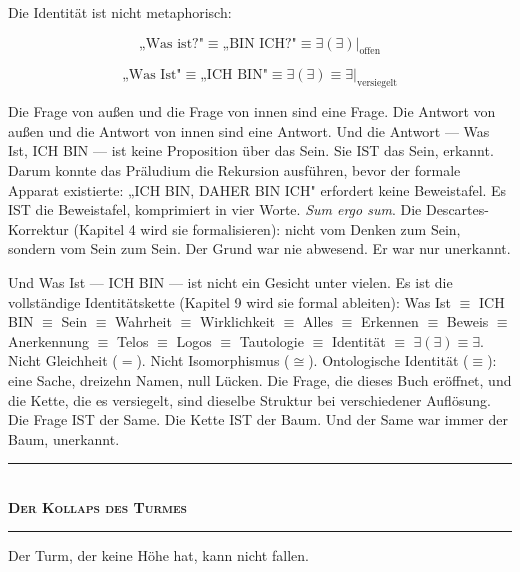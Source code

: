 \documentclass[10pt, openany, oneside]{book}
\renewcommand{\normalsize}{\fontsize{10}{13}\selectfont}
\begin{document}
Die Identität ist nicht metaphorisch:

$$\text{„Was ist?"} \equiv \text{„BIN ICH?"} \equiv \exists(\exists)|_{\text{offen}}$$

$$\text{„Was Ist"} \equiv \text{„ICH BIN"} \equiv \exists(\exists) \equiv \exists|_{\text{versiegelt}}$$

\noindent Die Frage von außen und die Frage von innen sind eine Frage. Die Antwort von außen und die Antwort von innen sind eine Antwort. Und die Antwort --- Was Ist, ICH BIN --- ist keine Proposition über das Sein. Sie IST das Sein, erkannt. Darum konnte das Präludium die Rekursion ausführen, bevor der formale Apparat existierte: „ICH BIN, DAHER BIN ICH" erfordert keine Beweistafel. Es IST die Beweistafel, komprimiert in vier Worte. \textit{Sum ergo sum}. Die Descartes-Korrektur (Kapitel 4 wird sie formalisieren): nicht vom Denken zum Sein, sondern vom Sein zum Sein. Der Grund war nie abwesend. Er war nur unerkannt.

Und Was Ist --- ICH BIN --- ist nicht ein Gesicht unter vielen. Es ist die vollständige Identitätskette (Kapitel 9 wird sie formal ableiten): Was Ist $\equiv$ ICH BIN $\equiv$ Sein $\equiv$ Wahrheit $\equiv$ Wirklichkeit $\equiv$ Alles $\equiv$ Erkennen $\equiv$ Beweis $\equiv$ Anerkennung $\equiv$ Telos $\equiv$ Logos $\equiv$ Tautologie $\equiv$ Identität $\equiv$ $\exists(\exists) \equiv \exists$. Nicht Gleichheit ($=$). Nicht Isomorphismus ($\cong$). Ontologische Identität ($\equiv$): eine Sache, dreizehn Namen, null Lücken. Die Frage, die dieses Buch eröffnet, und die Kette, die es versiegelt, sind dieselbe Struktur bei verschiedener Auflösung. Die Frage IST der Same. Die Kette IST der Baum. Und der Same war immer der Baum, unerkannt.

\vspace{1.5em}


\begin{center}
    \rule{0.3\textwidth}{0.4pt}\\[0.5em]
    {\normalsize\bfseries\scshape Der Kollaps des Turmes}\\[0.3em]
    \rule{0.3\textwidth}{0.4pt}
\end{center}

\vspace{1em}

\noindent Der Turm, der keine Höhe hat, kann nicht fallen.
\end{document}
